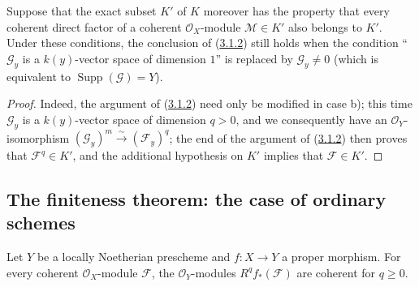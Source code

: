 \begin{corollary}[3.1.3]
\label{III.3.1.3}
Suppose that the exact subset $K'$ of $K$ moreover has the property
that every coherent direct factor of a coherent $\mathcal O_X$-module
$\mathcal M\in K'$ also belongs to $K'$. Under these conditions, the
conclusion of (\hyperref[III.3.1.2]{3.1.2}) still holds when the
condition ``$\mathcal G_y$ is a $k(y)$-vector space of dimension $1$''
is replaced by $\mathcal G_y\neq0$ (which is equivalent to
$\operatorname{Supp}(\mathcal G)=Y$).
\end{corollary}

\begin{proof}
Indeed, the argument of (\hyperref[III.3.1.2]{3.1.2}) need only be
modified in case b); this time $\mathcal G_y$ is a $k(y)$-vector space of
dimension $q>0$, and we consequently have an
$\mathcal O_Y$-isomorphism $(\mathcal G_y)^m\xrightarrow{\sim}(\mathcal F_y)^q$; the end
of the argument of (\hyperref[III.3.1.2]{3.1.2}) then proves that
$\mathcal F^q\in K'$, and the additional hypothesis on $K'$ implies that
$\mathcal F\in K'$.
\end{proof}

\subsection{The finiteness theorem: the case of ordinary schemes}
\label{subsection:III.3.2}

\begin{theorem}[3.2.1]
\label{III.3.2.1}
Let $Y$ be a locally Noetherian prescheme and $f:X\to Y$ a proper
morphism. For every coherent $\mathcal O_X$-module $\mathcal F$, the
$\mathcal O_Y$-modules $R^qf_*(\mathcal F)$ are coherent for $q\geq0$.
\end{theorem}

